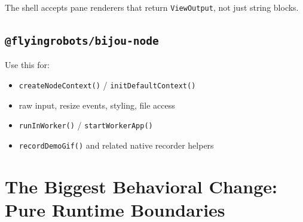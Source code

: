 The shell accepts pane renderers that return \texttt{V\allowbreak{}i\allowbreak{}e\allowbreak{}w\allowbreak{}O\allowbreak{}u\allowbreak{}t\allowbreak{}p\allowbreak{}u\allowbreak{}t}, not just string blocks.

\subsection{\texorpdfstring{\texttt{@\allowbreak{}f\allowbreak{}l\allowbreak{}y\allowbreak{}i\allowbreak{}n\allowbreak{}g\allowbreak{}r\allowbreak{}o\allowbreak{}b\allowbreak{}o\allowbreak{}t\allowbreak{}s\allowbreak{}/\allowbreak{}b\allowbreak{}i\allowbreak{}j\allowbreak{}o\allowbreak{}u\allowbreak{}-\allowbreak{}n\allowbreak{}o\allowbreak{}d\allowbreak{}e}}{}}\label{record-010-flyingrobotsbijou-node}

Use this for:

\begin{itemize}
\tightlist
\item
  \texttt{c\allowbreak{}r\allowbreak{}e\allowbreak{}a\allowbreak{}t\allowbreak{}e\allowbreak{}N\allowbreak{}o\allowbreak{}d\allowbreak{}e\allowbreak{}C\allowbreak{}o\allowbreak{}n\allowbreak{}t\allowbreak{}e\allowbreak{}x\allowbreak{}t\allowbreak{}(\allowbreak{})} / \texttt{i\allowbreak{}n\allowbreak{}i\allowbreak{}t\allowbreak{}D\allowbreak{}e\allowbreak{}f\allowbreak{}a\allowbreak{}u\allowbreak{}l\allowbreak{}t\allowbreak{}C\allowbreak{}o\allowbreak{}n\allowbreak{}t\allowbreak{}e\allowbreak{}x\allowbreak{}t\allowbreak{}(\allowbreak{})}
\item
  raw input, resize events, styling, file access
\item
  \texttt{r\allowbreak{}u\allowbreak{}n\allowbreak{}I\allowbreak{}n\allowbreak{}W\allowbreak{}o\allowbreak{}r\allowbreak{}k\allowbreak{}e\allowbreak{}r\allowbreak{}(\allowbreak{})} / \texttt{s\allowbreak{}t\allowbreak{}a\allowbreak{}r\allowbreak{}t\allowbreak{}W\allowbreak{}o\allowbreak{}r\allowbreak{}k\allowbreak{}e\allowbreak{}r\allowbreak{}A\allowbreak{}p\allowbreak{}p\allowbreak{}(\allowbreak{})}
\item
  \texttt{r\allowbreak{}e\allowbreak{}c\allowbreak{}o\allowbreak{}r\allowbreak{}d\allowbreak{}D\allowbreak{}e\allowbreak{}m\allowbreak{}o\allowbreak{}G\allowbreak{}i\allowbreak{}f\allowbreak{}(\allowbreak{})} and related native recorder helpers
\end{itemize}

\section{The Biggest Behavioral Change: Pure Runtime Boundaries}\label{record-010-the-biggest-behavioral-change-pure-runtime-boundaries}

